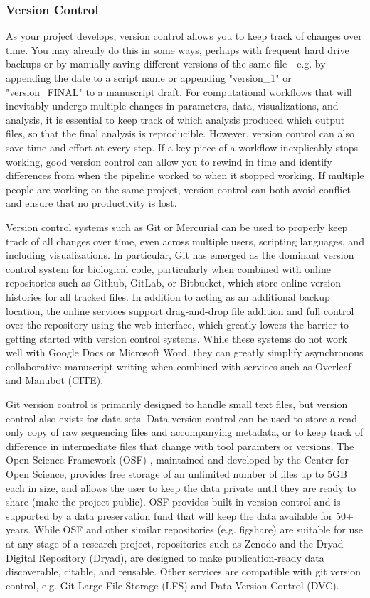 \documentclass[10pt,letterpaper]{article}
\begin{document}
 
\subsubsection*{Version Control} 

As your project develops, version control allows you to keep track of changes over time. 
You may already do this in some ways, perhaps with frequent hard drive backups or by manually saving different versions of the same file  - e.g. by appending the date to a script name or appending "version\_1" or "version\_FINAL" to a manuscript draft. 
For computational workflows that will inevitably undergo multiple changes in parameters, data, visualizations, and analysis, it is essential to keep track of which analysis produced which output files, so that the final analysis is reproducible. 
However, version control can also save time and effort at every step. 
If a key piece of a workflow inexplicably stops working, good version control can allow you to rewind in time and identify differences from when the pipeline worked to when it stopped working. 
If multiple people are working on the same project, version control can both avoid conflict and ensure that no productivity is lost. 

Version control systems such as Git or Mercurial can be used to properly keep track of all changes over time, even across multiple users, scripting languages, and including visualizations. 
In particular, Git has emerged as the dominant version control system for biological code, particularly when combined with online repositories such as Github, GitLab, or Bitbucket, which store online version histories for all tracked files.
In addition to acting as an additional backup location, the online services support drag-and-drop file addition and full control over the repository using the web interface, which greatly lowers the barrier to getting started with version control systems. 
While these systems do not work well with Google Docs or Microsoft Word, they can greatly simplify asynchronous collaborative manuscript writing when combined with services such as Overleaf and Manubot (CITE). 

Git version control is primarily designed to handle small text files, but version control also exists for data sets.
Data version control can be used to store a read-only copy of raw sequencing files and accompanying metadata, or to keep track of difference in intermediate files that change with tool paramters or versions. 
The Open Science Framework (OSF) \cite{foster2017open}, maintained and developed by the Center for Open Science, provides free storage of an unlimited number of files up to 5GB each in size, and allows the user to keep the data private until they are ready to share (make the project public). 
OSF provides built-in version control and is supported by a data preservation fund that will keep the data available for 50+ years. 
While OSF and other similar repositories (e.g. figshare) are suitable for use at any stage of a research project, repositories such as Zenodo and the Dryad Digital Repository (Dryad), are designed to make publication-ready data discoverable, citable, and reusable. 
Other services are compatible with git version control, e.g. Git Large File Storage (LFS) and Data Version Control (DVC).
\end{document}
